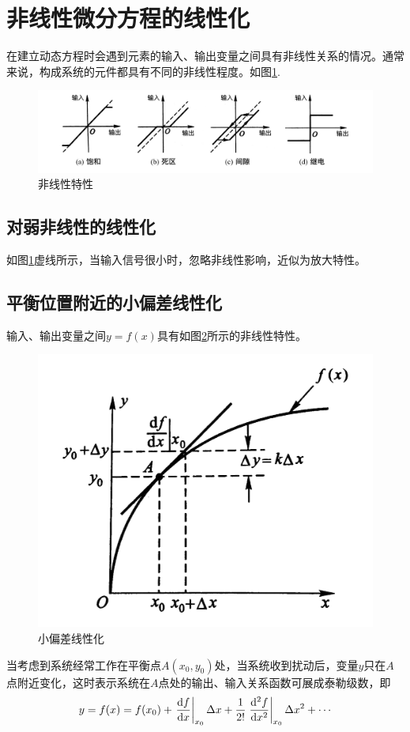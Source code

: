 \section{非线性微分方程的线性化}
在建立动态方程时会遇到元素的输入、输出变量之间具有非线性关系的情况。通常来说，构成系统的元件都具有不同的非线性程度。如图\ref{非线性}.
\begin{figure}[!htp]
	\centering
	\includegraphics[width=0.95\linewidth]{pic/非线性.jpg}
	\caption{非线性特性}
	\label{非线性}
\end{figure}

\subsection{对弱非线性的线性化}
如图\ref{非线性}虚线所示，当输入信号很小时，忽略非线性影响，近似为放大特性。

\subsection{平衡位置附近的小偏差线性化}
输入、输出变量之间$y=f(x)$具有如图\ref{小偏差线性化}所示的非线性特性。
\begin{figure}[!htp]
	\centering
	\includegraphics[width=0.5\linewidth]{pic/线性化.png}
	\caption{小偏差线性化}
	\label{小偏差线性化}
\end{figure}

当考虑到系统经常工作在平衡点$A(x_0,y_0)$处，当系统收到扰动后，变量$y$只在$A$点附近变化，这时表示系统在$A$点处的输出、输入关系函数可展成泰勒级数，即
\begin{equation}
	y = f(x) = f(x_0) + \left. \frac{\d f}{\d x} \right|_{x_0} \Delta x + \frac{1}{2!} \left. \frac{\d^2 f}{\d x^2}\right|_{x_0} \Delta x^2 + \cdots
	\label{线性化公式}
\end{equation}

